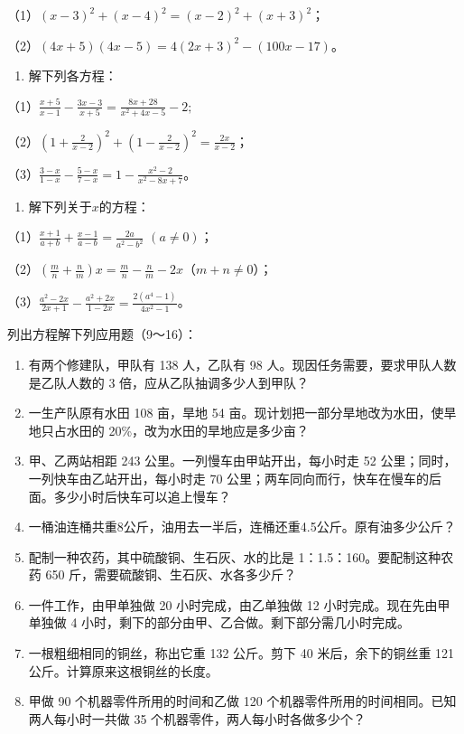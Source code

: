 （1）\((x - 3)^{2} + (x - 4)^{2} = (x - 2)^{2} + (x + 3)^{2}\)；

（2）\((4x + 5)(4x - 5) = 4(2x + 3)^{2} - (100x - 17)\)。

\begin{enumerate}[start=7]
\item
  解下列各方程：
\end{enumerate}

（1）\(\frac{x + 5}{x - 1} - \frac{3x - 3}{x + 5} = \frac{8x + 28}{x^2 + 4x - 5} - 2;\)

（2）\(\left(1 + \frac{2}{x - 2}\right)^2 + \left(1 - \frac{2}{x - 2}\right)^2 = \frac{2x}{x - 2}\)；

（3）\(\frac{3 - x}{1 - x} - \frac{5 - x}{7 - x} = 1 - \frac{x^2 - 2}{x^2 - 8x + 7}\)。

\begin{enumerate}[start=8]
\item
  解下列关于\(x\)的方程：
\end{enumerate}

（1）\(\frac{x + 1}{a + b} + \frac{x - 1}{a - b} = \frac{2a}{a^2 - b^2}\) \((a \neq 0)\)；

（2）\(\left(\frac{m}{n} + \frac{n}{m}\right)x = \frac{m}{n} - \frac{n}{m} - 2x\)（\(m + n \neq 0\)）；

（3）\(\frac{a^2 - 2x}{2x + 1} - \frac{a^2 + 2x}{1 - 2x} = \frac{2(a^4 - 1)}{4x^2 - 1}\)。

列出方程解下列应用题（9～16）：

\begin{enumerate}[start=9]
\item
  有两个修建队，甲队有 138 人，乙队有 98
  人。现因任务需要，要求甲队人数是乙队人数的 3
  倍，应从乙队抽调多少人到甲队？
\item
  一生产队原有水田 108 亩，旱地 54
  亩。现计划把一部分旱地改为水田，使旱地只占水田的
  20\%，改为水田的旱地应是多少亩？
\item
  甲、乙两站相距 243 公里。一列慢车由甲站开出，每小时走 52
  公里；同时，一列快车由乙站开出，每小时走 70
  公里；两车同向而行，快车在慢车的后面。多少小时后快车可以追上慢车？
\item
  一桶油连桶共重8公斤，油用去一半后，连桶还重4.5公斤。原有油多少公斤？
\item
  配制一种农药，其中硫酸铜、生石灰、水的比是 1：1.5：160。要配制这种农药
  650 斤，需要硫酸铜、生石灰、水各多少斤？
\item
  一件工作，由甲单独做 20 小时完成，由乙单独做 12
  小时完成。现在先由甲单独做 4
  小时，剩下的部分由甲、乙合做。剩下部分需几小时完成。
\item
  一根粗细相同的铜丝，称出它重 132 公斤。剪下 40 米后，余下的铜丝重 121
  公斤。计算原来这根铜丝的长度。
\item
  甲做 90 个机器零件所用的时间和乙做 120
  个机器零件所用的时间相同。已知两人每小时一共做 35
  个机器零件，两人每小时各做多少个？
\end{enumerate}

